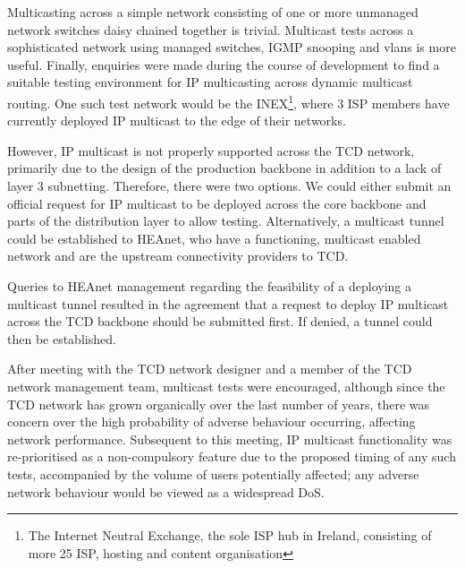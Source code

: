 Multicasting across a simple network consisting of one or 
more unmanaged network switches daisy chained together is trivial. 
Multicast tests across a sophisticated network using managed
switches, IGMP snooping and vlans is more useful. Finally, enquiries
were made during the course of development to find a suitable testing
environment for IP multicasting across dynamic multicast routing. One
such test network would be the INEX\footnote{The Internet Neutral
Exchange, the sole ISP hub in Ireland, consisting of more
25 ISP, hosting and content organisation}, where 3 ISP members 
have currently deployed IP multicast to the edge of their networks.


However, IP multicast is not properly supported across the 
TCD network, primarily due to the design of the production backbone in 
addition to a lack of layer 3 subnetting. Therefore, there were two 
options. We could either submit an official request for IP multicast to 
be deployed across the core backbone and parts of the distribution layer 
to allow testing. Alternatively, a multicast tunnel could be established
to HEAnet, who have a functioning, multicast enabled network and are the 
upstream connectivity providers to TCD. 


Queries to HEAnet management regarding the feasibility of a deploying
a multicast tunnel resulted in the agreement that a request to deploy IP
multicast across the TCD backbone should be submitted first. If denied,
a tunnel could then be established. 


After meeting with the TCD network designer and a member of the TCD 
network management team, multicast tests were encouraged, although 
since the TCD network has grown organically over the last number of
years, there was concern over the high probability of adverse behaviour
occurring, affecting network performance. Subsequent to this meeting, 
IP multicast functionality was re-prioritised as a non-compulsory
feature due to the proposed timing of any such tests, accompanied by 
the volume of users potentially affected; any adverse network behaviour 
would be viewed as a widespread DoS. 
